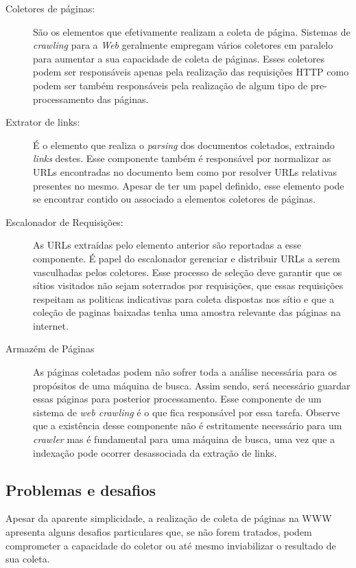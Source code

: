 \documentclass[10pt,twocolumn]{article}
\begin{document}
\begin{description}

\item[Coletores de páginas:] São os elementos que efetivamente realizam
a coleta de página. Sistemas de \emph{crawling} para a \emph{Web}
geralmente empregam vários coletores em paralelo para aumentar a sua
capacidade de coleta de páginas. Esses coletores podem ser responsáveis
apenas pela realização das requisições HTTP como podem ser também
responsáveis pela realização de algum tipo de pre-processamento das
páginas.

\item[Extrator de links:] É o elemento que realiza o \emph{parsing} dos
documentos coletados, extraindo \emph{links} destes. Esse componente
também é responsável por normalizar as URLs encontradas no documento bem
como por resolver URLs relativas presentes no mesmo. Apesar de ter um
papel definido, esse elemento pode se encontrar contido ou associado a
elementos coletores de páginas.

\item[Escalonador de Requisições:] As URLs extraídas pelo elemento
anterior são reportadas a esse componente. É papel do
escalonador gerenciar e distribuir URLs a serem vasculhadas pelos
coletores. Esse processo de seleção deve garantir que os sítios
visitados não sejam soterrados por requisições, que essas requisições
respeitam as politicas indicativas para coleta dispostas nos sítio e que
a coleção de paginas baixadas tenha uma amostra relevante das páginas na
internet.

\item[Armazém de Páginas] As páginas coletadas podem não sofrer toda a
análise necessária para os propósitos de uma máquina de busca. Assim
sendo, será necessário guardar essas páginas para posterior
processamento. Esse componente de um sistema de \emph{web crawling} é o
que fica responsável por essa tarefa. Observe que a existência desse
componente não é estritamente necessário para um \emph{crawler} mas é
fundamental para uma máquina de busca, uma vez que a indexação pode
ocorrer desassociada da extração de links.
\end{description}

\subsection{Problemas e desafios}

Apesar da aparente simplicidade, a realização de coleta de páginas na
WWW apresenta alguns desafios particulares que, se não forem tratados,
podem comprometer a capacidade do coletor ou até mesmo inviabilizar o
resultado de sua coleta. 
\end{document}
